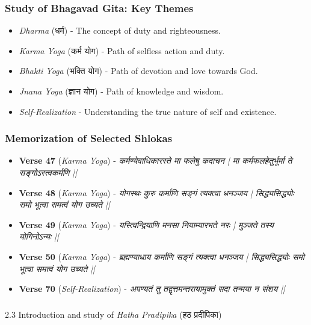 \begin{frame}[fragile]\frametitle{Study of Bhagavad Gita: Key Themes}

      \begin{itemize}
		\item \textit{Dharma} (धर्म) - The concept of duty and righteousness.
		\item \textit{Karma Yoga} (कर्म योग) - Path of selfless action and duty.
		\item \textit{Bhakti Yoga} (भक्ति योग) - Path of devotion and love towards God.
		\item \textit{Jnana Yoga} (ज्ञान योग) - Path of knowledge and wisdom.
		\item \textit{Self-Realization} - Understanding the true nature of self and existence.
	  \end{itemize}

\end{frame}


\begin{frame}[fragile]\frametitle{Memorization of Selected Shlokas}

      \begin{itemize}
		\item \textbf{Verse 47} (\textit{Karma Yoga}) - \textit{कर्मण्येवाधिकारस्ते मा फलेषु कदाचन | मा कर्मफलहेतुर्भूर्मा ते सङ्गोऽस्त्वकर्मणि ||}
		\item \textbf{Verse 48} (\textit{Karma Yoga}) - \textit{योगस्थः कुरु कर्माणि सङ्गं त्यक्त्वा धनञ्जय | सिद्ध्यसिद्ध्योः समो भूत्वा समत्वं योग उच्यते ||}
		\item \textbf{Verse 49} (\textit{Karma Yoga}) - \textit{यस्त्विन्द्रियाणि मनसा नियाम्यारभते नरः | मुञ्जते तस्य योगिनोऽन्यः ||}
		\item \textbf{Verse 50} (\textit{Karma Yoga}) - \textit{ब्रह्मण्याधाय कर्माणि सङ्गं त्यक्त्वा धनञ्जय | सिद्ध्यसिद्ध्योः समो भूत्वा समत्वं योग उच्यते ||}
		\item \textbf{Verse 70} (\textit{Self-Realization}) - \textit{अपण्यतं तु तद्वृत्तमन्तरायामुक्तं सदा तन्मया न संशय ||}
	  \end{itemize}

\end{frame}

\begin{frame}[fragile]\frametitle{}
\begin{center}
{\Large 2.3 Introduction and study of \textit{Hatha Pradipika} (हठ प्रदीपिका)}
\end{center}
\end{frame}

